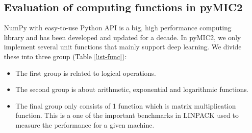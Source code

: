 
\subsection{Evaluation of computing functions in pyMIC2}
NumPy with easy-to-use Python API is a big, high performance computing library and has been developed and updated for a decade. In pyMIC2, we only implement several unit functions that mainly support deep learning. We divide these into three group (Table \ref{list-func}):
\begin{itemize}
	\item The first group is related to logical operations.
	\item The second group is about arithmetic, exponential and logarithmic functions. 
	\item The final group only consists of 1 function which is matrix multiplication function. This is a one of the important benchmarks in LINPACK used to measure the performance for a given machine.
\end{itemize}

